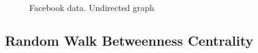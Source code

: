 \documentclass[envcountsame]{llncs}
\begin{document}
\begin{figure}[t]
\centering
{}

\caption{Facebook data. Undirected graph}
\label{fig:fb}
\end{figure}
\subsection{Random Walk Betweenness Centrality}
\end{document}
